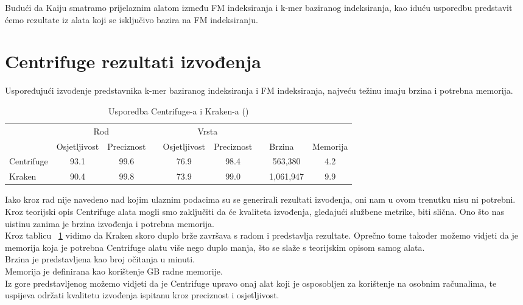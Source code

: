 \documentclass[times, utf8, seminar]{fer}
\begin{document}
Budući da Kaiju smatramo prijelaznim alatom između FM indeksiranja i k-mer baziranog indeksiranja, kao iduću usporedbu predstavit ćemo rezultate iz alata koji se isključivo bazira na FM indeksiranju.

\section{Centrifuge rezultati izvođenja}
Uspoređujući izvođenje predstavnika k-mer baziranog indeksiranja i FM indeksiranja, najveću težinu imaju brzina i potrebna memorija.
\begin{table}[]
	\centering
	\caption{Usporedba Centrifuge-a i Kraken-a (\cite{Centrifuge})}
	\label{CK}
	\begin{tabular}{lcclcclll}
		& \multicolumn{2}{c}{Rod}                                           &                      & \multicolumn{2}{c}{Vrsta}                                         &  &                               &                         \\
		& \multicolumn{1}{l}{Osjetljivost} & \multicolumn{1}{l}{Preciznost} &                      & \multicolumn{1}{l}{Osjetljivost} & \multicolumn{1}{l}{Preciznost} &  & Brzina                        & Memorija                \\
		Centrifuge & 93.1                             & 99.6                           &                      & 76.9                             & 98.4                           &  & \multicolumn{1}{c}{563,380}   & \multicolumn{1}{c}{4.2} \\
		Kraken     & 90.4                             & 99.8                           & \multicolumn{1}{c}{} & 73.9                             & 99.0                           &  & \multicolumn{1}{c}{1,061,947} & \multicolumn{1}{c}{9.9}
	\end{tabular}
\end{table}
Iako kroz rad nije navedeno nad kojim ulaznim podacima su se generirali rezultati izvođenja, oni nam u ovom trenutku nisu ni potrebni. Kroz teorijski opis Centrifuge alata mogli smo zaključiti da će kvaliteta izvođenja, gledajući službene metrike, biti slična. Ono što nas uistinu zanima je brzina izvođenja i potrebna memorija.
\\Kroz tablicu ~\ref{CK} vidimo da Kraken skoro duplo brže završava s radom i predstavlja rezultate. Oprečno tome također možemo vidjeti da je memorija koja je potrebna Centrifuge alatu više nego duplo manja, što se slaže s teorijskim opisom samog alata.
\\Brzina je predstavljena kao broj očitanja u minuti.
\\Memorija je definirana kao korištenje GB radne memorije.
\\Iz gore predstavljenog možemo vidjeti da je Centrifuge upravo onaj alat koji je osposobljen za korištenje na osobnim računalima, te uspijeva održati kvalitetu izvođenja ispitanu kroz preciznost i osjetljivost. 
\end{document}
